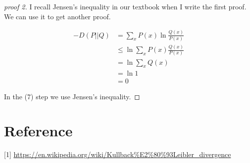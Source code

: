 \documentclass[12pt]{article}
\theoremstyle{mythm}
\begin{document}
\begin{proof}[proof 2]
	I recall Jensen's inequality in our textbook when I write the first proof. We can use it to get another proof.
	
	\begin{align}
	-D(P||Q)&= \sum_x P(x)\ln \frac{Q(x)}{P(x)}\\
	&\stackrel{}{\leq} \ln\sum_x P(x) \frac{Q(x)}{P(x)}\\
	&=\ln\sum_x Q(x)\\
	&=\ln 1\\
	&=0
	\end{align}
	
	In the (7) step we use Jensen's inequality.
\end{proof}
\section*{Reference}
[1] \url{https://en.wikipedia.org/wiki/Kullback%E2%80%93Leibler_divergence}
\end{document}
